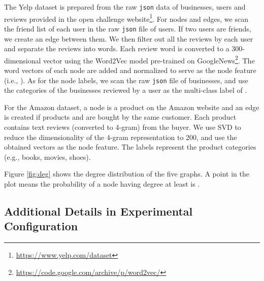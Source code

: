 \documentclass{article} \usepackage{iclr2020_conference,times}
\begin{document}
The Yelp dataset is prepared from the raw \texttt{json} data of businesses, users and reviews provided in the open challenge website\footnote{\url{https://www.yelp.com/dataset}}. For nodes and edges, we scan the friend list of each user in the raw \texttt{json} file of users. If two users are friends, we create an edge between them. We then filter out all the reviews by each user and separate the reviews into words. Each review word is converted to a 300-dimensional vector using the Word2Vec model pre-trained on GoogleNews\footnote{\url{https://code.google.com/archive/p/word2vec/}}. The word vectors of each node are added and normalized to serve as the node feature (i.e., ). As for the node labels, we scan the raw \texttt{json} file of businesses, and use the categories of the businesses reviewed by a user  as the multi-class label of . 


For the Amazon dataset, a node is a product on the Amazon website and an edge  is created if products  and  are bought by the same customer. 
Each product contains text reviews (converted to 4-gram) from the buyer. We use SVD to reduce the dimensionality of the 4-gram representation to 200, and use the obtained vectors as the node feature. The labels represent the product categories (e.g., books, movies, shoes).  



Figure \ref{fig:deg} shows the degree distribution of the five graphs. 
A point  in the plot means the probability of a node having degree at least  is . 

\subsection{Additional Details in Experimental Configuration}
\label{appendix: config}

\begin{table}[!ht]
\caption{URLs and commit number to run baseline codes}
    \centering
    \label{tab: url}
\end{table}
\end{document}
